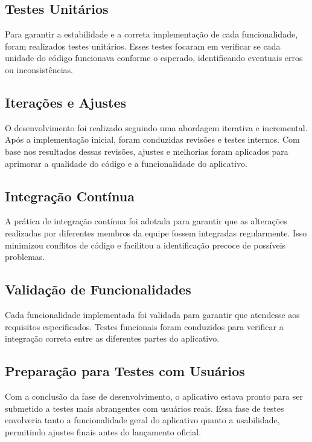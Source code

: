 \documentclass[
    12pt,                   %
    openright,              %
    oneside,                %
    a4paper,                %
    sumario=tradicional,    %
    english,                %
    brazil,                 %
    ]{abntex2}
\begin{document}
        \subsection{Testes Unitários}
        
        Para garantir a estabilidade e a correta implementação de cada funcionalidade, foram realizados testes unitários. Esses testes focaram em verificar se cada unidade do código funcionava conforme o esperado, identificando eventuais erros ou inconsistências.
        
        \subsection{Iterações e Ajustes}
        
        O desenvolvimento foi realizado seguindo uma abordagem iterativa e incremental. Após a implementação inicial, foram conduzidas revisões e testes internos. Com base nos resultados dessas revisões, ajustes e melhorias foram aplicados para aprimorar a qualidade do código e a funcionalidade do aplicativo.
        
        \subsection{Integração Contínua}
        
        A prática de integração contínua foi adotada para garantir que as alterações realizadas por diferentes membros da equipe fossem integradas regularmente. Isso minimizou conflitos de código e facilitou a identificação precoce de possíveis problemas.
        
        \subsection{Validação de Funcionalidades}
        
        Cada funcionalidade implementada foi validada para garantir que atendesse aos requisitos especificados. Testes funcionais foram conduzidos para verificar a integração correta entre as diferentes partes do aplicativo.
        
        \subsection{Preparação para Testes com Usuários}
        
        Com a conclusão da fase de desenvolvimento, o aplicativo estava pronto para ser submetido a testes mais abrangentes com usuários reais. Essa fase de testes envolveria tanto a funcionalidade geral do aplicativo quanto a usabilidade, permitindo ajustes finais antes do lançamento oficial.
        
\end{document}
